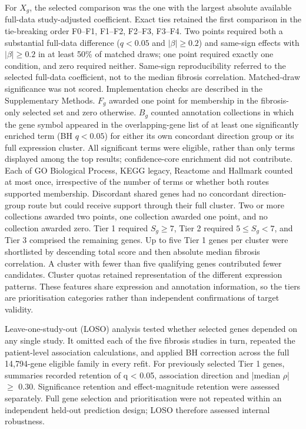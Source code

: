 \documentclass[11pt,a4paper]{article}
\begin{document}
For \(X_g\), the selected comparison was the one with the largest absolute available full-data study-adjusted coefficient. Exact ties retained the first comparison in the tie-breaking order F0--F1, F1--F2, F2--F3, F3--F4. Two points required both a substantial full-data difference (\(q<0.05\) and \(|\beta|\geq0.2\)) and same-sign effects with \(|\beta|\geq0.2\) in at least 50\% of matched draws; one point required exactly one condition, and zero required neither. Same-sign reproducibility referred to the selected full-data coefficient, not to the median fibrosis correlation. Matched-draw significance was not scored. Implementation checks are described in the Supplementary Methods. \(F_g\) awarded one point for membership in the fibrosis-only selected set and zero otherwise. \(B_g\) counted annotation collections in which the gene symbol appeared in the overlapping-gene list of at least one significantly enriched term (BH \(q<0.05\)) for either its own concordant direction group or its full expression cluster. All significant terms were eligible, rather than only terms displayed among the top results; confidence-core enrichment did not contribute. Each of GO Biological Process, KEGG legacy, Reactome and Hallmark counted at most once, irrespective of the number of terms or whether both routes supported membership. Discordant shared genes had no concordant direction-group route but could receive support through their full cluster. Two or more collections awarded two points, one collection awarded one point, and no collection awarded zero. Tier 1 required \(S_g\geq7\), Tier 2 required \(5\leq S_g<7\), and Tier 3 comprised the remaining genes. Up to five Tier 1 genes per cluster were shortlisted by descending total score and then absolute median fibrosis correlation. A cluster with fewer than five qualifying genes contributed fewer candidates. Cluster quotas retained representation of the different expression patterns. These features share expression and annotation information, so the tiers are prioritisation categories rather than independent confirmations of target validity.

Leave-one-study-out (LOSO) analysis tested whether selected genes depended on any single study. It omitted each of the five fibrosis studies in turn, repeated the patient-level association calculations, and applied BH correction across the full 14,794-gene eligible family in every refit. For previously selected Tier 1 genes, summaries recorded retention of q < 0.05, association direction and |median \ensuremath{\rho}| \ensuremath{\geq} 0.30. Significance retention and effect-magnitude retention were assessed separately. Full gene selection and prioritisation were not repeated within an independent held-out prediction design; LOSO therefore assessed internal robustness.
\end{document}
